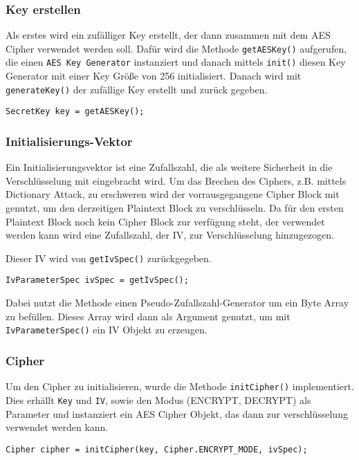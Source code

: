 \documentclass[12pt]{article}
\begin{document}
\subsubsection{Key erstellen}
Als erstes wird ein zufälliger Key erstellt, der dann zusammen mit dem AES
Cipher verwendet werden soll. Dafür wird die Methode \texttt{getAESKey()}
aufgerufen, die einen \texttt{AES Key Generator} instanziert und danach mittels
\texttt{init()} diesen Key Generator mit einer Key Größe von 256 initialisiert.
Danach wird mit \texttt{generateKey()} der zufällige Key erstellt und zurück
gegeben.

\begin{lstlisting}
SecretKey key = getAESKey();
\end{lstlisting}

\subsubsection{Initialisierungs-Vektor}
Ein Initialisierungsvektor ist eine Zufallszahl, die als weitere Sicherheit in
die Verschlüsselung mit eingebracht wird. Um das Brechen des Ciphers,
z.B. mittels Dictionary Attack, zu
erschweren wird der vorrausgegangene Cipher Block mit genutzt, um den derzeitigen
Plaintext Block zu verschlüsseln. Da für den ersten Plaintext Block noch kein
Cipher Block zur verfügung steht, der verwendet werden kann wird eine
Zufallszahl, der IV, zur Verschlüsselung hinzugezogen.

Dieser IV wird von \texttt{getIvSpec()} zurückgegeben. 

\begin{lstlisting}
IvParameterSpec ivSpec = getIvSpec();
\end{lstlisting}

Dabei nutzt die Methode
einen Pseudo-Zufallszahl-Generator um ein Byte Array zu befüllen. Dieses Array
wird dann als Argument genutzt, um mit \texttt{IvParameterSpec()} ein IV Objekt
zu erzeugen.

\subsubsection{Cipher}
Um den Cipher zu initialisieren, wurde die Methode \texttt{initCipher()}
implementiert. Dies erhällt \texttt{Key} und \texttt{IV}, sowie den Modus
(ENCRYPT, DECRYPT) als Parameter und instanziert ein AES Cipher Objekt, das dann zur
verschlüsselung verwendet werden kann.

\begin{lstlisting}
Cipher cipher = initCipher(key, Cipher.ENCRYPT_MODE, ivSpec);
\end{lstlisting}
\end{document}
